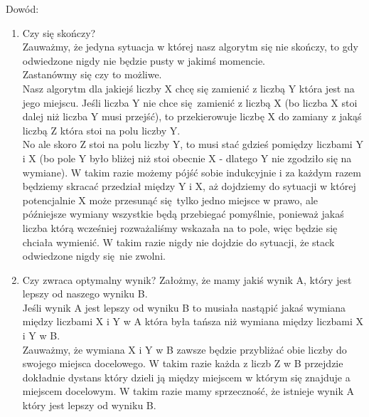 \documentclass[12pt]{article}
\begin{document}
Dowód:
\begin{enumerate}
    \item Czy się skończy?\\
    Zauważmy, że jedyna sytuacja w której nasz algorytm się nie skończy, to gdy odwiedzone nigdy nie będzie pusty w jakimś momencie.\\

    Zastanówmy się czy to możliwe.\\

    Nasz algorytm dla jakiejś liczby X chcę się zamienić z liczbą Y która jest na jego miejscu. Jeśli liczba Y nie chce się zamienić z liczbą X (bo liczba X stoi dalej niż liczba Y musi przejść), to przekierowuje liczbę X do zamiany z jakąś liczbą Z która stoi na polu liczby Y.\\

    No ale skoro Z stoi na polu liczby Y, to musi stać gdzieś pomiędzy liczbami Y i X (bo pole Y było bliżej niż stoi obecnie X - dlatego Y nie zgodziło się na wymiane). W takim razie możemy pójść sobie indukcyjnie i za każdym razem będziemy skracać przedział między Y i X, aż dojdziemy do sytuacji w której potencjalnie X może przesunąć się tylko jedno miejsce w prawo, ale późniejsze wymiany wszystkie będą przebiegać pomyślnie, ponieważ jakaś liczba którą wcześniej rozważaliśmy wskazała na to pole, więc będzie się chciała wymienić. W takim razie nigdy nie dojdzie do sytuacji, że stack odwiedzone nigdy się nie zwolni.\\
    \item Czy zwraca optymalny wynik?
    Założmy, że mamy jakiś wynik A, który jest lepszy od naszego wyniku B.\\
    Jeśli wynik A jest lepszy od wyniku B to musiała nastąpić jakaś wymiana między liczbami X i Y w A która była tańsza niż wymiana między liczbami X i Y w B. \\
    Zauważmy, że wymiana X i Y w B zawsze będzie przybliżać obie liczby do swojego miejsca docelowego. W takim razie każda z liczb Z w B przejdzie dokładnie dystans który dzieli ją między miejscem w którym się znajduje a miejscem docelowym.
    W takim razie mamy sprzeczność, że istnieje wynik A który jest lepszy od wyniku B.  \\
\end{enumerate}
\end{document}

